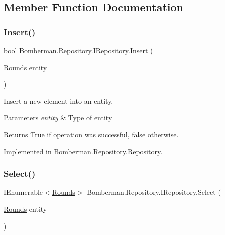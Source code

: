 \subsection{Member Function Documentation}
\mbox{\label{interface_bomberman_1_1_repository_1_1_i_repository_ab117e28c62bf81dee5e699cd9e376588}} 
\subsubsection{\texorpdfstring{Insert()}{Insert()}}
{\footnotesize\ttfamily bool Bomberman.\+Repository.\+I\+Repository.\+Insert (\begin{DoxyParamCaption}\item[{\mbox{\hyperlink{class_bomberman_1_1_data_1_1_rounds}{Rounds}}}]{entity }\end{DoxyParamCaption})}



Insert a new element into an entity. 


\begin{DoxyParams}{Parameters}
{\em entity} & Type of entity\\
\hline
\end{DoxyParams}
\begin{DoxyReturn}{Returns}
True if operation was successful, false otherwise.
\end{DoxyReturn}


Implemented in \mbox{\hyperlink{class_bomberman_1_1_repository_1_1_repository_a3374580de7f0c6859a95e87813d85983}{Bomberman.\+Repository.\+Repository}}.

\mbox{\label{interface_bomberman_1_1_repository_1_1_i_repository_a5d04a798b7326f2c05f77a29dd0de285}} 
\subsubsection{\texorpdfstring{Select()}{Select()}}
{\footnotesize\ttfamily I\+Enumerable$<$\mbox{\hyperlink{class_bomberman_1_1_data_1_1_rounds}{Rounds}}$>$ Bomberman.\+Repository.\+I\+Repository.\+Select (\begin{DoxyParamCaption}\item[{\mbox{\hyperlink{class_bomberman_1_1_data_1_1_rounds}{Rounds}}}]{entity }\end{DoxyParamCaption})}



